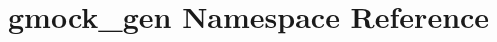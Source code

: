\hypertarget{namespacegmock__gen}{}\section{gmock\+\_\+gen Namespace Reference}
\label{namespacegmock__gen}
